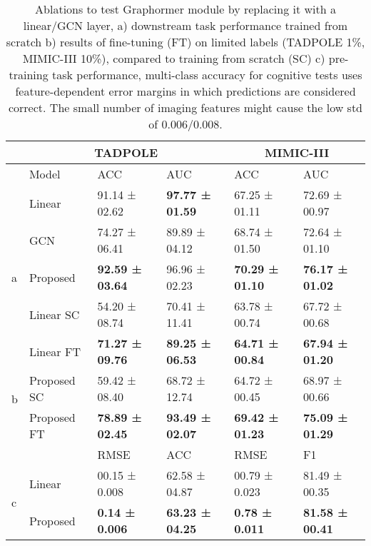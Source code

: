 \documentclass[runningheads]{llncs}
\begin{document}
\begin{table}[hbt!]
  \caption{Ablations to test Graphormer module by replacing it with a linear/GCN layer, a) downstream task performance trained from scratch b) results of fine-tuning (FT) on limited labels (TADPOLE 1\%, MIMIC-III 10\%), compared to training from scratch (SC) c) pre-training task performance, multi-class accuracy for cognitive tests uses feature-dependent error margins in which predictions are considered correct. The small number of imaging features might cause the low std of 0.006/0.008.}
  \centering 
    \begin{tabular}{p{0.4cm}|p{2cm}p{2.3cm}p{2.3cm}|p{2.3cm}p{2.3cm}}
        \toprule
        & \multicolumn{3}{c|}{TADPOLE} & \multicolumn{2}{|c}{MIMIC-III} \\
        \midrule
        &Model & ACC & AUC & ACC & AUC \\
        \midrule
        &Linear & 91.14 ± 02.62 & \textbf{97.77 ± 01.59} & 67.25 ± 01.11 & 72.69 ± 00.97\\
        \multirow{3}{*}{a} & GCN & 74.27 ± 06.41 & 89.89 ± 04.12 & 68.74 ± 01.50 & 72.64 ± 01.10\\
        &Proposed & \textbf{92.59 ± 03.64} & 96.96 ± 02.23 & \textbf{70.29 ± 01.10} & \textbf{76.17 ± 01.02}\\
        \midrule
        &Linear SC & 54.20 ± 08.74 & 70.41 ± 11.41 & 63.78 ± 00.74 & 67.72 ± 00.68\\
        \multirow{4}{*}{b} & Linear FT & \textbf{71.27 ± 09.76} & \textbf{89.25 ± 06.53} & \textbf{64.71 ± 00.84} & \textbf{67.94 ± 01.20} \\
        &Proposed SC & 59.42 ± 08.40 & 68.72 ± 12.74 &  64.72 ± 00.45 & 68.97 ± 00.66\\
        &Proposed FT & \textbf{78.89 ± 02.45} & \textbf{93.49 ± 02.07} & \textbf{69.42 ± 01.23} & \textbf{75.09 ± 01.29}\\
        \midrule
        && \parbox{2.4cm}{\centering RMSE} & \parbox{2.4cm}{\centering ACC} & \parbox{2.4cm}{\centering RMSE} & \parbox{2.4cm}{\centering F1} \\
        \midrule
       & Linear & 00.15 ± 0.008 & 62.58 ± 04.87 & 00.79 ± 0.023 & 81.49 ± 00.35\\
       & Proposed & \textbf{0.14 ± 0.006} & \textbf{63.23 ± 04.25} & \textbf{0.78 ± 0.011} & \textbf{81.58 ± 00.41}\\
        \bottomrule
    \end{tabular}
    \label{ablations}
\end{table}
\end{document}
